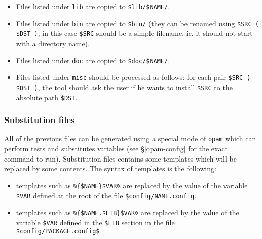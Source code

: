 \documentclass[a4paper,11pt]{article}
\begin{document}
\begin{itemize}
\item Files listed under {\tt lib} are copied to \verb+$lib/$NAME/+.
\item Files listed under {\tt bin} are copied to \verb+$bin/+ (they
  can be renamed using \verb+$SRC ( $DST )+; in this case \verb+$SRC+
  should be a simple filename, ie. it should not start with a
  directory name).
\item Files listed under {\tt doc} are copied to \verb+$doc/$NAME/+.
\item Files listed under {\tt misc} should be processed as follows:
  for each pair \verb+$SRC ( $DST )+, the tool should ask the user if
  he wants to install \verb+$SRC+ to the absolute path \verb+$DST+.
\end{itemize}

\subsubsection{Substitution files}
\label{subst}

All of the previous files can be generated using a special mode of
{\tt opam} which can perform tests and substitutes variables (see
\S\ref{opam-config} for the exact command to run). Substitution files
contains some templates which will be replaced by some contents. The
syntax of templates is the following:

\begin{itemize}

\item templates such as \verb+%{$NAME}$VAR%+ are replaced by the value
  of the variable \verb+$VAR+ defined at the root of the file
  \verb+$config/NAME.config+.

\item templates such as \verb+%{$NAME.$LIB}$VAR%+ are replaced by the
  value of the variable \verb+$VAR+ defined in the \verb+$LIB+ section
  in the file \verb+$config/PACKAGE.config$+


\end{itemize}
\end{document}
